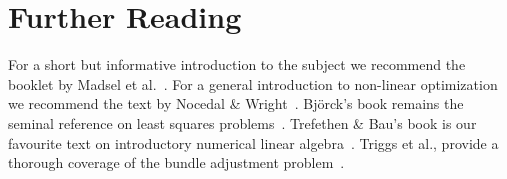 \chapter{Further Reading}
\label{chapter:further}
 For a short but informative introduction to the subject we recommend the booklet by Madsel et al.~\cite{madsen2004methods}. For a general introduction to non-linear optimization we recommend the text by Nocedal \& Wright~\cite{nocedal2000numerical}. Bj{\"o}rck's book remains the seminal reference on least squares problems~\cite{bjorck1996numerical}. Trefethen \& Bau's book is our favourite text on introductory numerical linear algebra~\cite{trefethen1997numerical}. Triggs et al., provide a thorough coverage of the bundle adjustment problem~\cite{triggs-etal-1999}.
